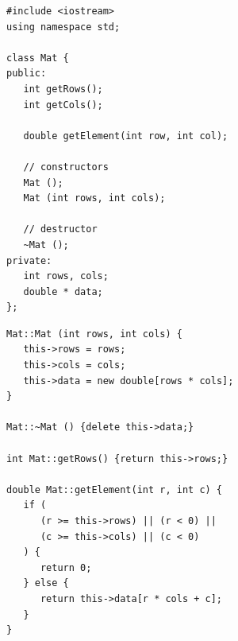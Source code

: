 \begin{frame}[fragile]
%
%
\begin{codebox}
\begin{verbatim}
#include <iostream>
using namespace std;

class Mat {
public:
   int getRows();
   int getCols();

   double getElement(int row, int col);

   // constructors
   Mat ();
   Mat (int rows, int cols);

   // destructor
   ~Mat ();
private:
   int rows, cols;
   double * data;
};
\end{verbatim}
\end{codebox}
%	
\begin{codebox}[... Fortsetzung ...]
\begin{verbatim}
Mat::Mat (int rows, int cols) {
   this->rows = rows;
   this->cols = cols;
   this->data = new double[rows * cols];
}

Mat::~Mat () {delete this->data;}

int Mat::getRows() {return this->rows;}

double Mat::getElement(int r, int c) {
   if (
      (r >= this->rows) || (r < 0) ||
      (c >= this->cols) || (c < 0)
   ) {
      return 0;
   } else {
      return this->data[r * cols + c];
   }
}
\end{verbatim}
\end{codebox}
%
\end{frame}


